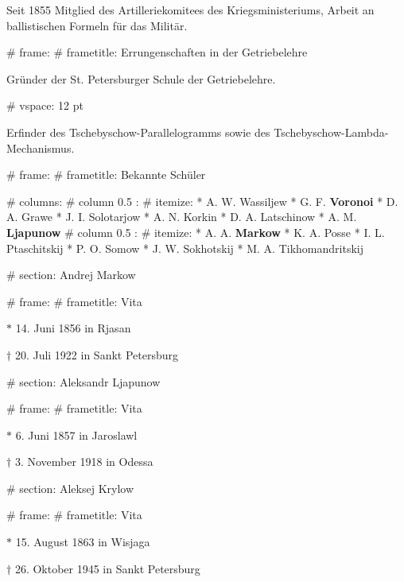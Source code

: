   Seit 1855 Mitglied des Artilleriekomitees des Kriegsministeriums,
  Arbeit an ballistischen Formeln für das Militär.

# frame:
  # frametitle: Errungenschaften in der Getriebelehre

  Gründer der St. Petersburger Schule der Getriebelehre.

  # vspace: 12 pt

  Erfinder des Tschebyschow-Parallelogramms sowie des Tschebyschow-Lambda-Mechanismus.


# frame:
  # frametitle: Bekannte Schüler

  # columns:
    # column {0.5 \textwidth}:
      # itemize:
        * A. W. Wassiljew
        * G. F. \textbf{Voronoi}
        * D. A. Grawe
        * J. I. Solotarjow
        * A. N. Korkin
        * D. A. Latschinow
        * A. M. \textbf{Ljapunow}
    # column {0.5 \textwidth}:
      # itemize:
        * A. A. \textbf{Markow}
        * K. A. Posse
        * I. L. Ptaschitskij
        * P. O. Somow
        * J. W. Sokhotskij
        * M. A. Tikhomandritskij




# section: Andrej Markow

# frame:
  # frametitle: Vita

  $*$ 14. Juni 1856 in Rjasan

  $\dagger$ 20. Juli 1922 in Sankt Petersburg



# section: Aleksandr Ljapunow

# frame:
  # frametitle: Vita

  $*$ 6. Juni 1857 in Jaroslawl

  $\dagger$ 3. November 1918 in Odessa




# section: Aleksej Krylow

# frame:
  # frametitle: Vita

  $*$ 15. August 1863 in Wisjaga

  $\dagger$ 26. Oktober 1945 in Sankt Petersburg
